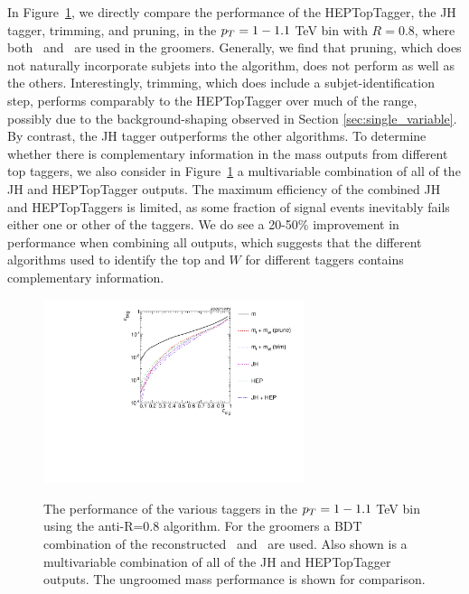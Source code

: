 In Figure~\ref{fig:pt1000_allcompare_AKt_R08_TG}, we directly compare the performance of the HEPTopTagger, the JH tagger, trimming, and pruning, in the $p_T = 1-1.1$ TeV bin with $R=0.8$, where both \topmass~and \wmass~are used in the groomers. Generally, we find that pruning, which does not naturally incorporate subjets into the algorithm, does not perform as well as the others. Interestingly, trimming, which does include a subjet-identification step, performs comparably to the HEPTopTagger over much of the range, possibly due to the background-shaping observed in Section \ref{sec:single_variable}. By contrast, the JH tagger outperforms the other algorithms. To determine whether there is complementary information in the mass outputs from different top taggers, we also consider in Figure~\ref{fig:pt1000_allcompare_AKt_R08_TG} a multivariable combination of all of the JH and HEPTopTagger outputs. The maximum efficiency of the combined JH and HEPTopTaggers is limited, as some fraction of signal events inevitably fails either one or other of the taggers. We do see a 20-50\% improvement in performance when combining all outputs, which suggests that the different algorithms used to identify the top and $W$ for different taggers contains complementary information.

\begin{figure}
\centering
{\includegraphics[width=0.68\textwidth]{./Figures/TTagging/multi_variable/pT.1TeV.R.0.8/Rocs_tagger_groom.pdf}}
\caption{The performance of the various taggers in the $p_T = 1-1.1$ TeV bin using the anti-\kT R=0.8 algorithm. For the groomers a BDT combination of the reconstructed \topmass~and \wmass~are used. Also shown is a multivariable combination of all of the JH and HEPTopTagger outputs. The ungroomed mass performance is shown for comparison.}
\label{fig:pt1000_allcompare_AKt_R08_TG}
\end{figure}


